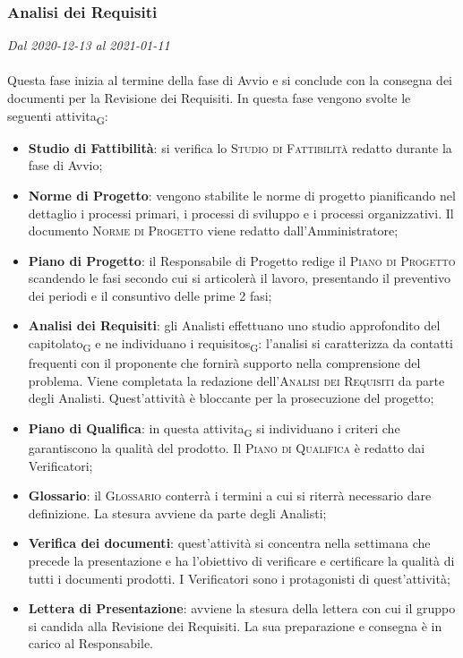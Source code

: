 \subsubsection{Analisi dei Requisiti}

\textit{Dal 2020-12-13 al 2021-01-11}
\\\\
Questa fase inizia al termine della fase di Avvio e si conclude con la consegna dei documenti per la Revisione dei Requisiti.
In questa fase vengono svolte le seguenti \gls{attivita}\textsubscript{G}:
\begin{itemize}
	\item \textbf{Studio di Fattibilità}: si verifica lo \textsc{Studio di Fattibilità} redatto durante la fase di Avvio;
	\item \textbf{Norme di Progetto}: vengono stabilite le norme di progetto pianificando nel dettaglio i processi primari, i processi di sviluppo e i processi organizzativi. Il documento \textsc{Norme di Progetto} viene redatto dall'Amministratore;
	\item \textbf{Piano di Progetto}: il Responsabile di Progetto redige il \textsc{Piano di Progetto} scandendo le fasi secondo cui si articolerà il lavoro, presentando il preventivo dei periodi e il consuntivo delle prime 2 fasi;
	\item \textbf{Analisi dei Requisiti}: gli Analisti effettuano uno studio approfondito del \gls{capitolato}\textsubscript{G} e ne individuano i \glspl{requisito}\textsubscript{G}: l'analisi si caratterizza da contatti frequenti con il proponente che fornirà supporto nella comprensione del problema. Viene completata la redazione dell'\textsc{Analisi dei Requisiti} da parte degli Analisti. Quest'attività è bloccante per la prosecuzione del progetto;
	\item \textbf{Piano di Qualifica}: in questa \gls{attivita}\textsubscript{G} si individuano i criteri che garantiscono la qualità del prodotto. Il \textsc{Piano di Qualifica} è redatto dai Verificatori;
	\item \textbf{Glossario}: il \textsc{Glossario} conterrà i termini a cui si riterrà necessario dare definizione. La stesura avviene da parte degli Analisti;
	\item \textbf{Verifica dei documenti}: quest'attività si concentra nella settimana che precede la presentazione e ha l'obiettivo di verificare e certificare la qualità di tutti i documenti prodotti. I Verificatori sono i protagonisti di quest'attività;
	\item \textbf{Lettera di Presentazione}: avviene la stesura della lettera con cui il gruppo si candida alla Revisione dei Requisiti. La sua preparazione e consegna è in carico al Responsabile.
\end{itemize}

